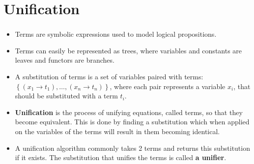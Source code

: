 
\section{Unification}

\begin{frame}
	\frametitle{\insertsection}
	\begin{itemize}
		\item Terms are symbolic expressions used to model logical propositions.
		\item Terms can easily be represented as trees, where variables and constants are leaves and functors are branches.
		\item A substitution of terms is a set of variables paired with terms: \(\left\{(x_1\rightarrow t_1 ),\ldots, (x_n\rightarrow t_n ) \right\} \), where each pair represents a variable \(x_i\), that should be substituted with a term \(t_i\).
		\item \textbf{Unification} is the process of unifying equations, called terms, so that they become equivalent. This is done by finding a substitution which when applied on the variables of the terms will result in them becoming identical.
		\item A unification algorithm commonly takes 2 terms and returns this substitution if it exists. The substitution that unifies the terms is called \textbf{a unifier}.
	\end{itemize}
\end{frame}

